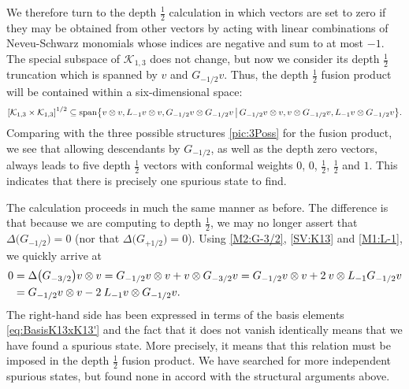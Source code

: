 \documentclass[a4paper,reqno,12pt]{report}
\theoremstyle{definition}
\numberwithin{equation}{section}
\let\originalleft\left     %
\let\originalright\right
\renewcommand{\left}{\mathopen{}\mathclose\bgroup\originalleft}
\renewcommand{\right}{\aftergroup\egroup\originalright}
\newcommand{\sqbrac}[1]{\left[ #1 \right]}
\newcommand{\set}[1]{\left\{ #1 \right\}}
\newcommand{\Kac}[1]{\mathcal{K}_{#1}}       %
\newcommand{\fuse}{\mathbin{\times}}                                            %
\newcommand{\coproductsymb}{\Delta}                                                %
\newcommand{\coproduct}[1]{\coproductsymb \bigl( #1 \bigr)}                        %
\newcommand{\rhs}{right-hand side}
\newcommand{\ns}{Neveu-Schwarz}
\DeclareMathOperator{\vspn}{span}
\theoremstyle{plain}
\begin{document}
We therefore turn to the depth $\frac{1}{2}$ calculation in which vectors are set to zero if they may be obtained from other vectors by acting with linear combinations of \ns{} monomials whose indices are negative and sum to at most $-1$.  The special subspace of $\Kac{1,3}$ does not change, but now we consider its depth $\frac{1}{2}$ truncation which is spanned by $v$ and $G_{-1/2} v$.  Thus, the depth $\frac{1}{2}$ fusion product will be contained within a six-dimensional space:
\begin{equation} \label{eq:BasisK13xK13'}
\sqbrac{\Kac{1,3} \fuse \Kac{1,3}}^{1/2} \subseteq \vspn \set{v \otimes v, L_{-1} v \otimes v, G_{-1/2} v \otimes G_{-1/2} v \,\middle\vert\, G_{-1/2} v \otimes v, v \otimes G_{-1/2} v, L_{-1} v \otimes G_{-1/2} v}.
\end{equation}
Comparing with the three possible structures \eqref{pic:3Poss} for the fusion product, we see that allowing descendants by $G_{-1/2}$, as well as the depth zero vectors, always leads to five depth $\frac{1}{2}$ vectors with conformal weights $0$, $0$, $\frac{1}{2}$, $\frac{1}{2}$ and $1$.  This indicates that there is precisely one spurious state to find.

The calculation proceeds in much the same manner as before.  The difference is that because we are computing to depth $\frac{1}{2}$, we may no longer assert that $\coproduct{G_{-1/2}} = 0$ (nor that $\coproduct{G_{+1/2}} = 0$).  Using \eqref{M2:G-3/2}, \eqref{SV:K13} and \eqref{M1:L-1}, we quickly arrive at
\begin{align}
0 &= \coproduct{G_{-3/2}} v \otimes v = G_{-1/2} v \otimes v + v \otimes G_{-3/2} v = G_{-1/2} v \otimes v + 2 \: v \otimes L_{-1} G_{-1/2} v \notag \\
&= G_{-1/2} v \otimes v - 2 \: L_{-1} v \otimes G_{-1/2} v.
\end{align}
The \rhs{} has been expressed in terms of the basis elements \eqref{eq:BasisK13xK13'} and the fact that it does not vanish identically means that we have found a spurious state.  More precisely, it means that this relation must be imposed in the depth $\frac{1}{2}$ fusion product.  We have searched for more independent spurious states, but found none in accord with the structural arguments above.
\end{document}
